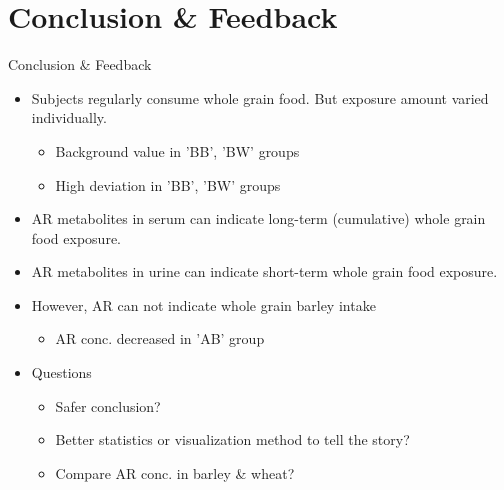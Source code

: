 \documentclass{beamer}
\begin{document}
\section{Conclusion \& Feedback}
\begin{frame}{Conclusion \& Feedback}
\begin{itemize}
	\item Subjects regularly consume whole grain food. But exposure amount varied individually.
	\begin{itemize}
		\item Background value in 'BB', 'BW' groups	
		\item High deviation in 'BB', 'BW' groups
	\end{itemize}

	\item AR metabolites in serum can indicate long-term (cumulative) whole grain food exposure.
	\item AR metabolites in urine can indicate short-term whole grain food exposure.
	\item However, AR can not indicate whole grain barley intake
		\begin{itemize}
		\item AR conc. decreased in 'AB' group
		\end{itemize}
	
	\item Questions
	\begin{itemize}
		\item Safer conclusion?
		\item Better statistics or visualization method to tell the story?
		\item Compare AR conc. in barley \& wheat?
	\end{itemize}

	
	
\end{itemize}

\end{frame}
\end{document}
